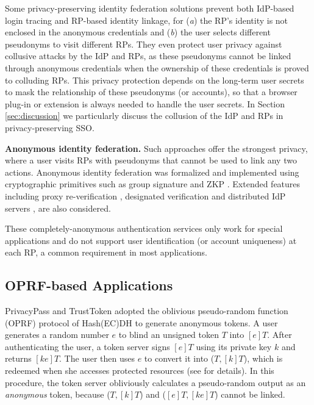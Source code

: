 Some privacy-preserving identity federation solutions \cite{PseudoID,ELPASSO,UnlimitID,Opaak,uprov,hyperledge-idemix} prevent both IdP-based login tracing and RP-based identity linkage, for (\emph{a}) the RP's identity is not enclosed in the anonymous credentials and (\emph{b}) the user selects different pseudonyms to visit different RPs.
They even protect user privacy against collusive attacks by the IdP and RPs, as these pseudonyms cannot be linked through anonymous credentials \cite{anon-credential-2001, idemix, anon-credential} when the ownership of these credentials is proved to colluding RPs. %
This privacy protection depends on the long-term user secrets to mask the relationship of these pseudonyms (or accounts),
        so that a browser plug-in or extension is always needed to handle the user secrets. 
In Section \ref{sec:discussion}
we particularly discuss the collusion of the IdP and RPs in privacy-preserving SSO.


\noindent\textbf{Anonymous identity federation.}
Such approaches offer the strongest privacy,
    where a user visits RPs with pseudonyms that cannot be used to link any two actions.
Anonymous identity federation was formalized \cite{WangWS13} and implemented using cryptographic primitives such as group signature and ZKP \cite{WangWS13, HanCSTWW20, HanCSTW18}.
Extended features including proxy re-verification \cite{HanCSTWW20}, designated verification \cite{HanCSTW18} and distributed IdP servers \cite{TSAPP}, are also considered. 

These completely-anonymous authentication services only work for special applications and do not support user identification (or account uniqueness) at each RP, a common requirement in most applications.

\subsection{OPRF-based Applications}
PrivacyPass and TrustToken \cite{privacypass,trusttoken} adopted the oblivious pseudo-random function (OPRF) protocol of Hash(EC)DH \cite{oprf-proved,voprf-proved} to generate anonymous tokens. %
A user generates a random number $e$ to blind an unsigned token $T$ into $[e]T$. After authenticating the user, a token server signs $[e]T$ using its private key $k$ and returns $[k e]T$. The user then uses $e$ to convert it into ($T, [k]T$),
        which is redeemed when she accesses protected resources
 (see \cite{privacypass,trusttoken} for details).
In this procedure, the token server obliviously calculates a pseudo-random output as an \emph{anonymous} token,
    because ($T, [k]T$) and ($[e]T, [ke]T$) cannot be linked.

